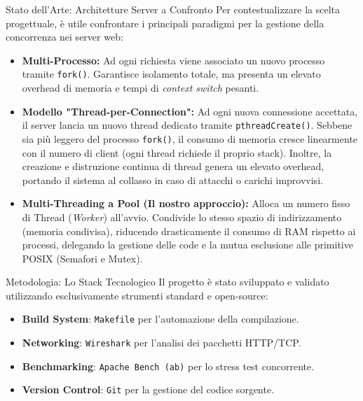 \documentclass[aspectratio=169, 10pt]{beamer}
\begin{document}
\begin{frame}{Stato dell'Arte: Architetture Server a Confronto}
    Per contestualizzare la scelta progettuale, è utile confrontare i principali paradigmi per la gestione della concorrenza nei server web:
    
    \vspace{0.2cm}
    \begin{itemize}
        \item \textbf{Multi-Processo:}
        Ad ogni richiesta viene associato un nuovo processo tramite \texttt{fork()}. Garantisce isolamento totale, ma presenta un elevato overhead di memoria e tempi di \textit{context switch} pesanti.
        
        \item \textbf{Modello "Thread-per-Connection":}
        Ad ogni nuova connessione accettata, il server lancia un nuovo thread dedicato tramite \texttt{pthreadCreate()}. Sebbene sia più leggero del processo \texttt{fork()}, il consumo di memoria cresce linearmente con il numero di client (ogni thread richiede il proprio stack). Inoltre, la creazione e distruzione continua di thread genera un elevato overhead, portando il sistema al collasso in caso di attacchi o carichi improvvisi.
        
        \item \textbf{Multi-Threading a Pool (Il nostro approccio):}
        Alloca un numero fisso di Thread (\textit{Worker}) all'avvio. Condivide lo stesso spazio di indirizzamento (memoria condivisa), riducendo drasticamente il consumo di RAM rispetto ai processi, delegando la gestione delle code e la mutua esclusione alle primitive POSIX (Semafori e Mutex).
    \end{itemize}
\end{frame}

\begin{frame}{Metodologia: Lo Stack Tecnologico}
    Il progetto è stato sviluppato e validato utilizzando esclusivamente strumenti standard e open-source:
    
    \begin{itemize}
        \item \textbf{Build System}: \texttt{Makefile} per l'automazione della compilazione.
        \item \textbf{Networking}: \texttt{Wireshark} per l'analisi dei pacchetti HTTP/TCP.
        \item \textbf{Benchmarking}: \texttt{Apache Bench (ab)} per lo stress test concorrente.
        \item \textbf{Version Control}: \texttt{Git} per la gestione del codice sorgente.
    \end{itemize}
\end{frame}
\end{document}
